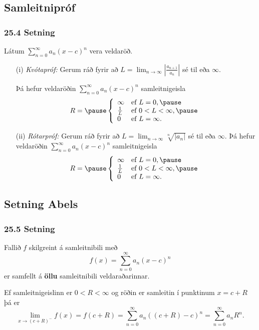 \subsection[t]{Samleitnipróf}
 \subsubsection{25.4 Setning}  
Látum $\sum_{n=0}^\infty a_n(x-c)^n$ vera veldaröð.\pause
\begin{itemize}
\item[(i)]  \emph{Kvótapróf:}  Gerum ráð fyrir að 
$L=\lim_{n\rightarrow\infty}\left|\frac{a_{n+1}}{a_n}\right|$ sé til
eða $\infty$. \pause 

Þá hefur veldaröðin  $\sum_{n=0}^\infty a_n(x-c)^n$
samleitnigeisla 
$$R=\pause \left\{\begin{array}{ll}
\infty & \mbox{ef }L=0,\pause\\
\frac{1}{L} & \mbox{ef }0<L<\infty,\pause\\
0 & \mbox{ef }L=\infty.\\
\end{array}
\right.
$$\pause
\item[(ii)]  \emph{Rótarpróf:} \pause Gerum ráð fyrir að 
$L=\lim_{n\rightarrow\infty}\sqrt[n]{|a_n|}$ sé til
eða $\infty$. \pause 
Þá hefur veldaröðin  $\sum_{n=0}^\infty a_n(x-c)^n$
samleitnigeisla 
$$R=\pause \left\{\begin{array}{ll}
\infty & \mbox{ef }L=0,\pause\\
\frac{1}{L} & \mbox{ef }0<L<\infty,\pause\\
0 & \mbox{ef }L=\infty.\\
\end{array}
\right.
$$
\end{itemize}


\subsection[t]{Setning Abels}
 \subsubsection{25.5 Setning}
Fallið $f$ skilgreint á samleitnibili með 
$$
f(x)=\sum_{n=0}^\infty a_n(x-c)^n
$$ \pause 
er samfellt á {\bf öllu}
samleitnibili veldaraðarinnar.  

Ef samleitnigeislinn er $0<R<\infty$
og röðin er samleitin í punktinum $x=c+R$ \pause
þá er 
$$\lim_{x\rightarrow (c+R)^-}f(x)=f(c+R)=\sum_{n=0}^\infty
a_n((c+R)-c)^n=\sum_{n=0}^\infty a_nR^n.$$

